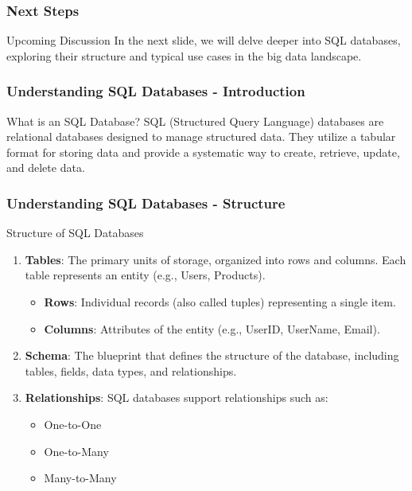 \documentclass[aspectratio=169]{beamer}
\begin{document}
\begin{frame}[fragile]
    \frametitle{Next Steps}
    \begin{block}{Upcoming Discussion}
        In the next slide, we will delve deeper into SQL databases, exploring their structure and typical use cases in the big data landscape.
    \end{block}
\end{frame}

\begin{frame}[fragile]
    \frametitle{Understanding SQL Databases - Introduction}
    \begin{block}{What is an SQL Database?}
    SQL (Structured Query Language) databases are relational databases designed to manage structured data. They utilize a tabular format for storing data and provide a systematic way to create, retrieve, update, and delete data.
    \end{block}
\end{frame}

\begin{frame}[fragile]
    \frametitle{Understanding SQL Databases - Structure}
    \begin{block}{Structure of SQL Databases}
    \begin{enumerate}
        \item \textbf{Tables}: The primary units of storage, organized into rows and columns. Each table represents an entity (e.g., Users, Products).
            \begin{itemize}
                \item \textbf{Rows}: Individual records (also called tuples) representing a single item.
                \item \textbf{Columns}: Attributes of the entity (e.g., UserID, UserName, Email).
            \end{itemize}
        \item \textbf{Schema}: The blueprint that defines the structure of the database, including tables, fields, data types, and relationships.
        \item \textbf{Relationships}: SQL databases support relationships such as:
            \begin{itemize}
                \item One-to-One
                \item One-to-Many
                \item Many-to-Many
            \end{itemize}
    \end{enumerate}
    \end{block}
\end{frame}
\end{document}
